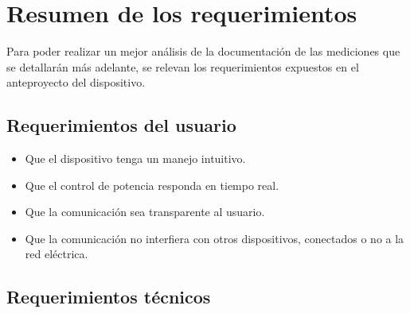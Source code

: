 \section{Resumen de los requerimientos\label{sec:Requerimientos}}

 Para poder realizar un mejor análisis de la documentación de las mediciones que se detallarán más adelante, se relevan los requerimientos expuestos en el anteproyecto del dispositivo.

  \subsection{Requerimientos del usuario}

 \begin{itemize}


 \item Que el dispositivo tenga un manejo intuitivo.%

 \item Que el control de potencia responda en tiempo real.
 \item Que la comunicación sea transparente al usuario.
 \item Que la comunicación no interfiera con otros dispositivos, conectados o no a la red eléctrica.

 \end{itemize}

 \subsection{Requerimientos técnicos}

